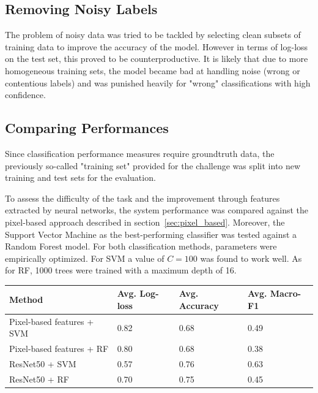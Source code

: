 \documentclass[11pt]{article}
\begin{document}
	
	\subsection{Removing Noisy Labels}
	The problem of noisy data was tried to be tackled by selecting clean subsets of training data to improve the accuracy of the model. However in terms of log-loss on the test set, this proved to be counterproductive. It is likely that due to more homogeneous training sets, the model became bad at handling noise (wrong or contentious labels) and was punished heavily for "wrong" classifications with high confidence.
	
	\subsection{Comparing Performances}
	\label{sec:class_comparison}
	Since classification performance measures require groundtruth data, the previously so-called "training set" provided for the challenge was split into new training and test sets for the evaluation.
		
	To assess the difficulty of the task and the improvement through features extracted by neural networks, the system performance was compared against the pixel-based approach described in section~\ref{sec:pixel_based}.
	Moreover, the Support Vector Machine as the best-performing classifier was tested against a Random Forest model. For both classification methods, parameters were empirically optimized. For SVM a value of $C=100$ was found to work well. As for RF, 1000 trees were trained with a maximum depth of 16. 
	
	\begin{center}
		\bgroup
		\def\arraystretch{1.1}
		\begin{tabular}{ | m{5cm} | m{2cm} | m{2cm} | m{2cm} |} 
			
			\hline
			Method & Avg. Log-loss & Avg. Accuracy & Avg. Macro-F1 \\
			\hline
			\hline
			Pixel-based features + SVM & 0.82 & 0.68 & 0.49  \\
			\hline
			Pixel-based features + RF & 0.80 & 0.68 & 0.38  \\
			\hline
			ResNet50 + SVM & 0.57 & 0.76 & 0.63 \\
			\hline
			ResNet50 + RF & 0.70 & 0.75 & 0.45  \\
			\hline
		\end{tabular}
		\egroup
		\label{tab:pb_vs_nn}
	\end{center}
	
\end{document}
